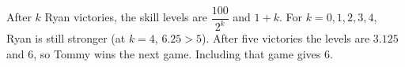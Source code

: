 After $k$ Ryan victories, the skill levels are $\dfrac{100}{2^k}$ and $1+k$. For $k=0,1,2,3,4$, Ryan is still stronger (at $k=4$, $6.25>5$). After five victories the levels are $3.125$ and $6$, so Tommy wins the next game. Including that game gives $\boxed 6$.
